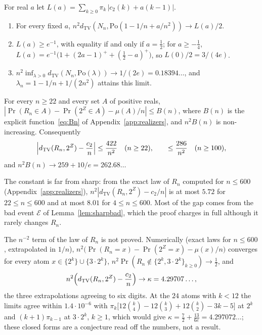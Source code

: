 \begin{theorem}\label{thm:bestpois}
For real $a$ let $L(a)=\sum_{k\ge0}\pi_k\,|c_2(k)+a(k-1)|$.
\begin{enumerate}[label=(\roman*),leftmargin=2em]
\item For every fixed $a$, $n^2d_{\mathrm{TV}}(N_n,\mathrm{Po}(1-1/n+a/n^2))\to L(a)/2$.
\item $L(a)\ge e^{-1}$, with equality if and only if $a=\tfrac12$; for $a\ge-\tfrac14$, $L(a)=e^{-1}\bigl(1+(2a-1)^++(\tfrac12-a)^+\bigr)$, so $L(0)/2=3/(4e)$.
\item $n^2\inf_{\lambda>0}d_{\mathrm{TV}}(N_n,\mathrm{Po}(\lambda))\to1/(2e)=0.18394\ldots$, and $\lambda_n=1-1/n+1/(2n^2)$ attains this limit.
\end{enumerate}
\end{theorem}

\begin{proposition}\label{prop:sharpC}
For every $n\ge22$ and every set $A$ of positive reals, $|\Pr(R_n\in A)-\Pr(2^Z\in A)-\mu(A)/n|\le B(n)$, where $B(n)$ is the explicit function~\eqref{eq:Bn} of Appendix~\ref{app:realizers}, and $n^2B(n)$ is non-increasing. Consequently
\[
\Bigl|d_{\mathrm{TV}}(R_n,2^Z)-\frac{c_2}{n}\Bigr|\le\frac{422}{n^2}\quad(n\ge22),\qquad\le\frac{286}{n^2}\quad(n\ge100),
\]
and $n^2B(n)\to259+10/e=262.68\ldots$ 
\end{proposition}

\noindent The constant is far from sharp: from the exact law of $R_n$ computed for $n\le600$ (Appendix~\ref{app:realizers}), $n^2|d_{\mathrm{TV}}(R_n,2^Z)-c_2/n|$ is at most $5.72$ for $22\le n\le600$ and at most $8.01$ for $4\le n\le600$. Most of the gap comes from the bad event $\mathcal E$ of Lemma~\ref{lem:sharpbad}, which the proof charges in full although it rarely changes $R_n$.

\begin{remark}\label{rem:secondopen}
The $n^{-2}$ term of the law of $R_n$ is not proved. Numerically (exact laws for $n\le600$, extrapolated in $1/n$), $n^2\bigl(\Pr(R_n=x)-\Pr(2^Z=x)-\mu(x)/n\bigr)$ converges for every atom $x\in\{2^k\}\cup\{3\cdot2^k\}$, $n^2\Pr(R_n\notin\{2^k,3\cdot2^k\}_{k\ge0})\to\tfrac12$, and
\[
n^2\Bigl(d_{\mathrm{TV}}(R_n,2^Z)-\frac{c_2}n\Bigr)\to\kappa=4.29707\ldots,
\]
the three extrapolations agreeing to six digits. At the $24$ atoms with $k<12$ the limits agree within $1.4\cdot10^{-6}$ with $\pi_k\bigl[12\binom k4-12\binom k3+12\binom k2-3k-5\bigr]$ at $2^k$ and $(k+1)\pi_{k-1}$ at $3\cdot2^k$, $k\ge1$, which would give $\kappa=\tfrac72+\tfrac{13}{6e}=4.297072\ldots$; these closed forms are a conjecture read off the numbers, not a result. 
\end{remark}

